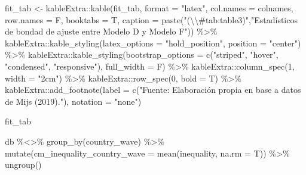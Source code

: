\documentclass[
  12pt,
  a4paper,
]{article}
\newenvironment{Shaded}{\begin{snugshade}}{\end{snugshade}}
\newcommand{\AttributeTok}[1]{\textcolor[rgb]{0.77,0.63,0.00}{#1}}
\newcommand{\DecValTok}[1]{\textcolor[rgb]{0.00,0.00,0.81}{#1}}
\newcommand{\FunctionTok}[1]{\textcolor[rgb]{0.00,0.00,0.00}{#1}}
\newcommand{\NormalTok}[1]{#1}
\newcommand{\OtherTok}[1]{\textcolor[rgb]{0.56,0.35,0.01}{#1}}
\newcommand{\SpecialCharTok}[1]{\textcolor[rgb]{0.00,0.00,0.00}{#1}}
\newcommand{\StringTok}[1]{\textcolor[rgb]{0.31,0.60,0.02}{#1}}
\begin{document}
\begin{Shaded}
\begin{Highlighting}[]
\NormalTok{fit\_tab }\OtherTok{\textless{}{-}}\NormalTok{ kableExtra}\SpecialCharTok{::}\FunctionTok{kable}\NormalTok{(fit\_tab, }
                             \AttributeTok{format =} \StringTok{"latex"}\NormalTok{, }
                             \AttributeTok{col.names =}\NormalTok{ colnames,}
                             \AttributeTok{row.names =}\NormalTok{ F,}
                             \AttributeTok{booktabs =}\NormalTok{ T, }
                             \AttributeTok{caption =} \FunctionTok{paste}\NormalTok{(}\StringTok{"(}\SpecialCharTok{\textbackslash{}\textbackslash{}}\StringTok{\#tab:table3)"}\NormalTok{,}\StringTok{"Estadísticos de bondad de ajuste entre Modelo D y Modelo F"}\NormalTok{)) }\SpecialCharTok{\%\textgreater{}\%} 
\NormalTok{  kableExtra}\SpecialCharTok{::}\FunctionTok{kable\_styling}\NormalTok{(}\AttributeTok{latex\_options =} \StringTok{"hold\_position"}\NormalTok{, }
                            \AttributeTok{position =} \StringTok{"center"}\NormalTok{) }\SpecialCharTok{\%\textgreater{}\%}
\NormalTok{  kableExtra}\SpecialCharTok{::}\FunctionTok{kable\_styling}\NormalTok{(}\AttributeTok{bootstrap\_options =} \FunctionTok{c}\NormalTok{(}\StringTok{"striped"}\NormalTok{, }\StringTok{"hover"}\NormalTok{, }\StringTok{"condensed"}\NormalTok{, }\StringTok{"responsive"}\NormalTok{), }\AttributeTok{full\_width =}\NormalTok{ F) }\SpecialCharTok{\%\textgreater{}\%} 
\NormalTok{  kableExtra}\SpecialCharTok{::}\FunctionTok{column\_spec}\NormalTok{(}\DecValTok{1}\NormalTok{, }\AttributeTok{width =} \StringTok{"2cm"}\NormalTok{) }\SpecialCharTok{\%\textgreater{}\%}
\NormalTok{  kableExtra}\SpecialCharTok{::}\FunctionTok{row\_spec}\NormalTok{(}\DecValTok{0}\NormalTok{, }\AttributeTok{bold =}\NormalTok{ T) }\SpecialCharTok{\%\textgreater{}\%} 
\NormalTok{  kableExtra}\SpecialCharTok{::}\FunctionTok{add\_footnote}\NormalTok{(}\AttributeTok{label =} \FunctionTok{c}\NormalTok{(}\StringTok{"Fuente: Elaboración propia en base a datos de Mijs (2019)."}\NormalTok{), }\AttributeTok{notation =} \StringTok{"none"}\NormalTok{)}

\NormalTok{fit\_tab}

\NormalTok{db }\SpecialCharTok{\%\textless{}\textgreater{}\%} 
  \FunctionTok{group\_by}\NormalTok{(country\_wave) }\SpecialCharTok{\%\textgreater{}\%}
  \FunctionTok{mutate}\NormalTok{(}\AttributeTok{cm\_inequality\_country\_wave =} \FunctionTok{mean}\NormalTok{(inequality, }\AttributeTok{na.rm =}\NormalTok{ T)) }\SpecialCharTok{\%\textgreater{}\%} 
  \FunctionTok{ungroup}\NormalTok{() }


\end{Highlighting}
\end{Shaded}
\end{document}
